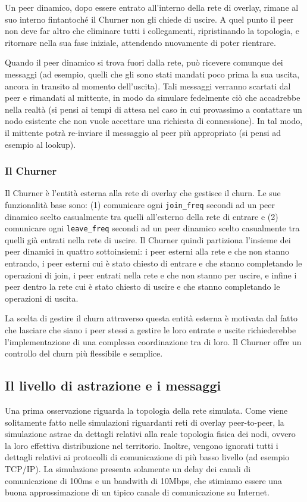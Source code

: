 \documentclass[prodmode,acmtap]{acmlarge}
\begin{document}
Un peer dinamico, dopo essere entrato all'interno della rete di overlay, rimane al suo interno fintantoché il Churner non gli chiede di uscire. A quel punto il peer non deve far altro che eliminare tutti i collegamenti, ripristinando la topologia, e ritornare nella sua fase iniziale, attendendo nuovamente di poter rientrare. 

Quando il peer dinamico si trova fuori dalla rete, può ricevere comunque dei messaggi (ad esempio, quelli che gli sono stati mandati poco prima la sua uscita, ancora in transito al momento dell'uscita). Tali messaggi verranno scartati dal peer e rimandati al mittente, in modo da simulare fedelmente ciò che accadrebbe nella realtà (si pensi ai tempi di attesa nel caso in cui provassimo a contattare un nodo esistente che non vuole accettare una richiesta di connessione). In tal modo, il mittente potrà re-inviare il messaggio al peer più appropriato (si pensi ad esempio al lookup).

\subsubsection*{Il Churner}
Il Churner è l'entità esterna alla rete di overlay che gestisce il churn. Le sue funzionalità base sono: (1) comunicare ogni \texttt{join\_freq} secondi ad un peer dinamico scelto casualmente tra quelli all'esterno della rete di entrare e (2) comunicare ogni \texttt{leave\_freq} secondi ad un peer dinamico scelto casualmente tra quelli già entrati nella rete di uscire. Il Churner quindi partiziona l'insieme dei peer dinamici in quattro sottoinsiemi: i peer esterni alla rete e che non stanno entrando, i peer esterni cui è stato chiesto di entrare e che stanno completando le operazioni di join, i peer entrati nella rete e che non stanno per uscire, e infine i peer dentro la rete cui è stato chiesto di uscire e che stanno completando le operazioni di uscita.

La scelta di gestire il churn attraverso questa entità esterna è motivata dal fatto che lasciare che siano i peer stessi a gestire le loro entrate e uscite richiederebbe l'implementazione di una complessa coordinazione tra di loro. Il Churner offre un controllo del churn più flessibile e semplice.


\subsection{Il livello di astrazione e i messaggi}

Una prima osservazione riguarda la topologia della rete simulata. Come viene solitamente fatto nelle simulazioni riguardanti reti di overlay peer-to-peer, la simulazione astrae da dettagli relativi alla reale topologia fisica dei nodi, ovvero la loro effettiva distribuzione nel territorio. Inoltre, vengono ignorati tutti i dettagli relativi ai protocolli di comunicazione di più basso livello (ad esempio TCP/IP). La simulazione presenta solamente un delay dei canali di comunicazione di 100ms e un bandwith di 10Mbps, che stimiamo essere una buona approssimazione di un tipico canale di comunicazione su Internet.
\end{document}
